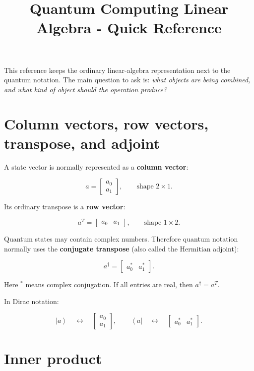 \documentclass[11pt,a4paper]{article}
\title{\textbf{Quantum Computing Linear Algebra - Quick Reference}}
\author{}
\date{}
\newcommand{\ket}[1]{\left|#1\right\rangle}
\newcommand{\bra}[1]{\left\langle#1\right|}
\begin{document}
\maketitle
\vspace{-1.5em}

This reference keeps the ordinary linear-algebra representation next to the
quantum notation. The main question to ask is: \emph{what objects are being
combined, and what kind of object should the operation produce?}

\section{Column vectors, row vectors, transpose, and adjoint}

A state vector is normally represented as a \textbf{column vector}:

\[
a =
\begin{bmatrix}
a_0\\
a_1
\end{bmatrix},
\qquad
\text{shape } 2\times1.
\]

Its ordinary transpose is a \textbf{row vector}:

\[
a^T =
\begin{bmatrix}
a_0 & a_1
\end{bmatrix},
\qquad
\text{shape } 1\times2.
\]

Quantum states may contain complex numbers. Therefore quantum notation normally
uses the \textbf{conjugate transpose} (also called the Hermitian adjoint):

\[
a^\dagger =
\begin{bmatrix}
a_0^* & a_1^*
\end{bmatrix}.
\]

Here $^*$ means complex conjugation. If all entries are real, then
$a^\dagger=a^T$.

In Dirac notation:

\[
\ket{a}
\quad\longleftrightarrow\quad
\begin{bmatrix}
a_0\\a_1
\end{bmatrix},
\qquad
\bra{a}
\quad\longleftrightarrow\quad
\begin{bmatrix}
a_0^* & a_1^*
\end{bmatrix}.
\]

\section{Inner product}
\end{document}
